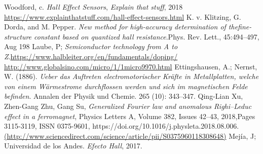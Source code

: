 \documentclass[%
 reprint,
 amsmath,amssymb,
 aps,
]{revtex4-1}
\begin{document}
\begin{thebibliography}{9}

Woodford, c. \textit{Hall Effect Sensors}, \textit{Explain that stuff}, 2018 \url{https://www.explainthatstuff.com/hall-effect-sensors.html}
 K. v. Klitzing, G. Dorda, and M. Pepper. \textit{New method for high-accuracy determination of thefine-structure constant based on quantized hall resistance}.Phys. Rev. Lett., 45:494–497, Aug 198
Laube, P; \textit{Semiconductor technology from A to Z}.\url{https://www.halbleiter.org/en/fundamentals/doping/}
\url{http://www.globalsino.com/micro/1/1micro9970.html}
 Ettingshausen, A.; Nernst, W. (1886). \textit{Ueber das Auftreten electromotorischer Kräfte in Metallplatten, welche von einem Wärmestrome durchflossen werden und sich im magnetischen Felde befinden}. Annalen der Physik und Chemie. 265 (10): 343–347.
 Qing-Lian Xu, Zhen-Gang Zhu, Gang Su, \textit{Generalized Fourier law and anomalous Righi–Leduc effect in a ferromagnet}, Physics Letters A, Volume 382, Issues 42–43, 2018,Pages 3115-3119, ISSN 0375-9601, https://doi.org/10.1016/j.physleta.2018.08.006. \url{(http://www.sciencedirect.com/science/article/pii/S0375960118308648)}
 Mejía, J; Universidad de los Andes. \textit{Efecto Hall}, 2017.

\end{thebibliography}
\end{document}
